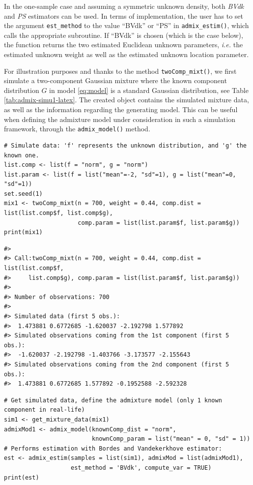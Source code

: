 In the one-sample case and assuming a symmetric unknown density, both \emph{BVdk} and \emph{PS} estimators can be used. In terms of implementation, the user has to set the argument \texttt{est\_method} to the value ``BVdk'' or ``PS'' in \texttt{admix\_estim()}, which calls the appropriate subroutine. If ``BVdk'' is chosen (which is the case below), the function returns the two estimated Euclidean unknown parameters, \emph{i.e.} the estimated unknown weight as well as the estimated unknown location parameter.

For illustration purposes and thanks to the method \texttt{twoComp\_mixt()}, we first simulate a two-component Gaussian mixture where the known component distribution \(G\) in model \eqref{eq:model} is a standard Gaussian distribution, see Table \ref{tab:admix-simu1-latex}. The created object contains the simulated mixture data, as well as the information regarding the generating model. This can be useful when defining the admixture model under consideration in such a simulation framework, through the \texttt{admix\_model()} method.

\begin{verbatim}
# Simulate data: 'f' represents the unknown distribution, and 'g' the known one.
list.comp <- list(f = "norm", g = "norm")
list.param <- list(f = list("mean"=-2, "sd"=1), g = list("mean"=0, "sd"=1))
set.seed(1)
mix1 <- twoComp_mixt(n = 700, weight = 0.44, comp.dist = list(list.comp$f, list.comp$g),
                     comp.param = list(list.param$f, list.param$g))
print(mix1)
\end{verbatim}

\begin{verbatim}
#> 
#> Call:twoComp_mixt(n = 700, weight = 0.44, comp.dist = list(list.comp$f, 
#>     list.comp$g), comp.param = list(list.param$f, list.param$g))
#> 
#> Number of observations: 700 
#> 
#> Simulated data (first 5 obs.): 
#>  1.473881 0.6772685 -1.620037 -2.192798 1.577892
#> Simulated observations coming from the 1st component (first 5 obs.): 
#>  -1.620037 -2.192798 -1.403766 -3.173577 -2.155643
#> Simulated observations coming from the 2nd component (first 5 obs.): 
#>  1.473881 0.6772685 1.577892 -0.1952588 -2.592328
\end{verbatim}

\begin{verbatim}
# Get simulated data, define the admixture model (only 1 known component in real-life)
sim1 <- get_mixture_data(mix1)
admixMod1 <- admix_model(knownComp_dist = "norm",
                         knownComp_param = list("mean" = 0, "sd" = 1))
# Performs estimation with Bordes and Vandekerkhove estimator:
est <- admix_estim(samples = list(sim1), admixMod = list(admixMod1),
                   est_method = 'BVdk', compute_var = TRUE)
print(est)
\end{verbatim}

